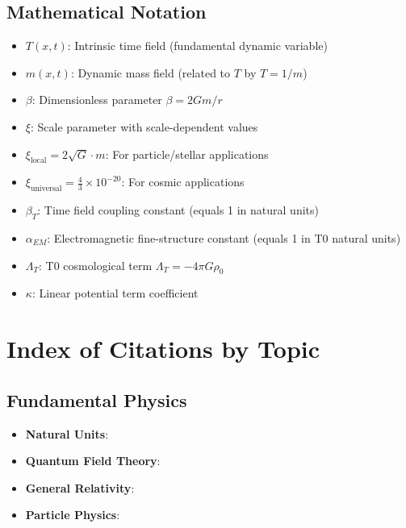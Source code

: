 \documentclass[12pt,a4paper]{article}
\begin{document}
	\subsection{Mathematical Notation}
	\label{app:math_notation}
	
	\begin{itemize}
		\item $T(x,t)$: Intrinsic time field (fundamental dynamic variable)
		\item $m(x,t)$: Dynamic mass field (related to $T$ by $T = 1/m$)
		\item $\beta$: Dimensionless parameter $\beta = 2Gm/r$
		\item $\xi$: Scale parameter with scale-dependent values
		\item $\xi_{\text{local}} = 2\sqrt{G} \cdot m$: For particle/stellar applications
		\item $\xi_{\text{universal}} = \frac{4}{3} \times 10^{-20}$: For cosmic applications
		\item $\beta_T$: Time field coupling constant (equals 1 in natural units)
		\item $\alpha_{EM}$: Electromagnetic fine-structure constant (equals 1 in T0 natural units)
		\item $\Lambda_T$: T0 cosmological term $\Lambda_T = -4\pi G \rho_0$
		\item $\kappa$: Linear potential term coefficient
	\end{itemize}
	


	\section*{Index of Citations by Topic}
	\label{app:citation_index}
	
	\subsection*{Fundamental Physics}
	\begin{itemize}
		\item \textbf{Natural Units}: \citet{planck1900,planck1906,weinberg1995,peskin1995}
		\item \textbf{Quantum Field Theory}: \citet{weinberg1995,peskin1995,srednicki2007,zee2010}
		\item \textbf{General Relativity}: \citet{einstein1915,misner1973,carroll2004,wald1984}
		\item \textbf{Particle Physics}: \citet{griffiths2008,perkins2000,weinberg2003}
	\end{itemize}
	
\end{document}

